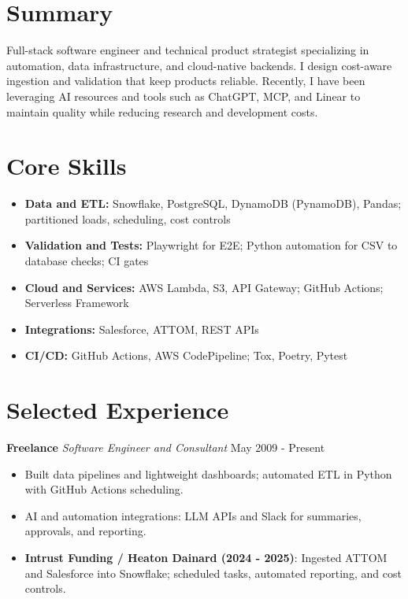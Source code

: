 \documentclass[10pt]{article}
\begin{document}
\section*{Summary}
Full-stack software engineer and technical product strategist specializing in automation, data infrastructure, and cloud-native backends. I design cost-aware ingestion and validation that keep products reliable. Recently, I have been leveraging AI resources and tools such as ChatGPT, MCP, and Linear to maintain quality while reducing research and development costs.

\section*{Core Skills}
\begin{itemize}[leftmargin=*]
  \item \textbf{Data and ETL:} Snowflake, PostgreSQL, DynamoDB (PynamoDB), Pandas; partitioned loads, scheduling, cost controls
  \item \textbf{Validation and Tests:} Playwright for E2E; Python automation for CSV to database checks; CI gates
  \item \textbf{Cloud and Services:} AWS Lambda, S3, API Gateway; GitHub Actions; Serverless Framework
  \item \textbf{Integrations:} Salesforce, ATTOM, REST APIs
  \item \textbf{CI/CD:} GitHub Actions, AWS CodePipeline; Tox, Poetry, Pytest
\end{itemize}

\section*{Selected Experience}
\noindent\textbf{Freelance} \textit{Software Engineer and Consultant} \hfill May 2009 - Present\par
\begin{itemize}
  \item Built data pipelines and lightweight dashboards; automated ETL in Python with GitHub Actions scheduling.
  \item AI and automation integrations: LLM APIs and Slack for summaries, approvals, and reporting.
  \item \textbf{Intrust Funding / Heaton Dainard (2024 - 2025)}: Ingested ATTOM and Salesforce into Snowflake; scheduled tasks, automated reporting, and cost controls.
\end{itemize}
\end{document}
